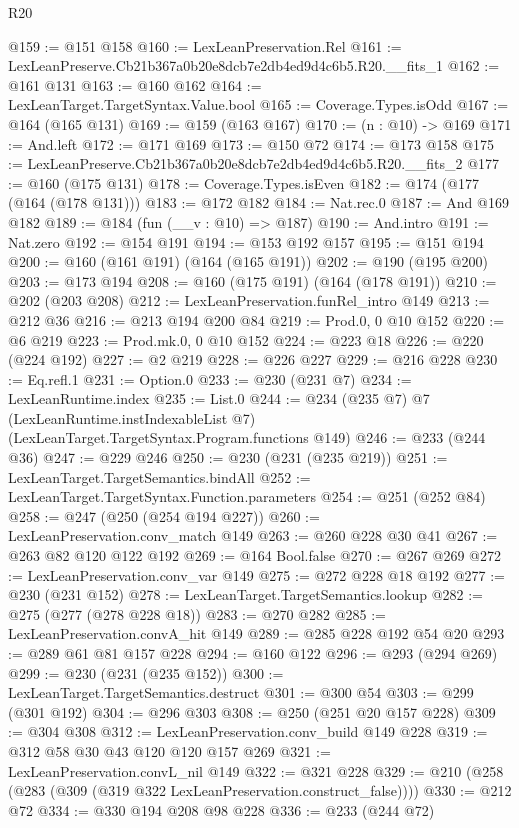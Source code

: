 \begin{lexlean}{R20}
\begin{coremodule}
@159 := @151 @158
@160 := LexLeanPreservation.Rel
@161 := LexLeanPreserve.Cb21b367a0b20e8dcb7e2db4ed9d4c6b5.R20.__fits_1
@162 := @161 @131
@163 := @160 @162
@164 := LexLeanTarget.TargetSyntax.Value.bool
@165 := Coverage.Types.isOdd
@167 := @164 (@165 @131)
@169 := @159 (@163 @167)
@170 := (n : @10) -> @169
@171 := And.left
@172 := @171 @169
@173 := @150 @72
@174 := @173 @158
@175 := LexLeanPreserve.Cb21b367a0b20e8dcb7e2db4ed9d4c6b5.R20.__fits_2
@177 := @160 (@175 @131)
@178 := Coverage.Types.isEven
@182 := @174 (@177 (@164 (@178 @131)))
@183 := @172 @182
@184 := Nat.rec.{0}
@187 := And @169 @182
@189 := @184 (fun (__v : @10) => @187)
@190 := And.intro
@191 := Nat.zero
@192 := @154 @191
@194 := @153 @192 @157
@195 := @151 @194
@200 := @160 (@161 @191) (@164 (@165 @191))
@202 := @190 (@195 @200)
@203 := @173 @194
@208 := @160 (@175 @191) (@164 (@178 @191))
@210 := @202 (@203 @208)
@212 := LexLeanPreservation.funRel_intro @149
@213 := @212 @36
@216 := @213 @194 @200 @84
@219 := Prod.{0, 0} @10 @152
@220 := @6 @219
@223 := Prod.mk.{0, 0} @10 @152
@224 := @223 @18
@226 := @220 (@224 @192)
@227 := @2 @219
@228 := @226 @227
@229 := @216 @228
@230 := Eq.refl.{1}
@231 := Option.{0}
@233 := @230 (@231 @7)
@234 := LexLeanRuntime.index
@235 := List.{0}
@244 := @234
    (@235 @7)
    @7
    (LexLeanRuntime.instIndexableList @7)
    (LexLeanTarget.TargetSyntax.Program.functions @149)
@246 := @233 (@244 @36)
@247 := @229 @246
@250 := @230 (@231 (@235 @219))
@251 := LexLeanTarget.TargetSemantics.bindAll
@252 := LexLeanTarget.TargetSyntax.Function.parameters
@254 := @251 (@252 @84)
@258 := @247 (@250 (@254 @194 @227))
@260 := LexLeanPreservation.conv_match @149
@263 := @260 @228 @30 @41
@267 := @263 @82 @120 @122 @192
@269 := @164 Bool.false
@270 := @267 @269
@272 := LexLeanPreservation.conv_var @149
@275 := @272 @228 @18 @192
@277 := @230 (@231 @152)
@278 := LexLeanTarget.TargetSemantics.lookup
@282 := @275 (@277 (@278 @228 @18))
@283 := @270 @282
@285 := LexLeanPreservation.convA_hit @149
@289 := @285 @228 @192 @54 @20
@293 := @289 @61 @81 @157 @228
@294 := @160 @122
@296 := @293 (@294 @269)
@299 := @230 (@231 (@235 @152))
@300 := LexLeanTarget.TargetSemantics.destruct
@301 := @300 @54
@303 := @299 (@301 @192)
@304 := @296 @303
@308 := @250 (@251 @20 @157 @228)
@309 := @304 @308
@312 := LexLeanPreservation.conv_build @149 @228
@319 := @312 @58 @30 @43 @120 @120 @157 @269
@321 := LexLeanPreservation.convL_nil @149
@322 := @321 @228
@329 := @210 (@258 (@283 (@309 (@319 @322 LexLeanPreservation.construct_false))))
@330 := @212 @72
@334 := @330 @194 @208 @98 @228
@336 := @233 (@244 @72)

\end{coremodule}
\end{lexlean}
